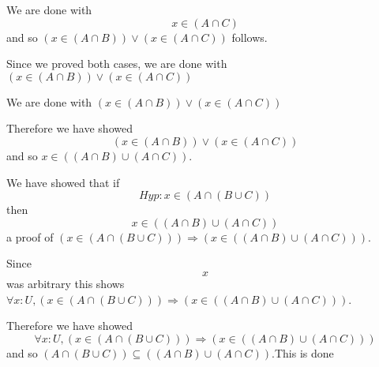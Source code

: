 \documentclass[11pt, oneside]{article}
\begin{document}
 We are done with $$x \in (A \cap C) $$ and so $(x \in (A \cap B)) \lor (x \in (A \cap C)) $ follows.

 Since we proved both cases, we are done with $(x \in (A \cap B)) \lor (x \in (A \cap C)) $

 We are done with $(x \in (A \cap B)) \lor (x \in (A \cap C)) $

 Therefore we have showed $$(x \in (A \cap B)) \lor (x \in (A \cap C)) $$ and so $x \in ((A \cap B) \cup (A \cap C)) $.

 We have showed that if $$Hyp : x \in (A \cap (B \cup C)) $$ then $$x \in ((A \cap B) \cup (A \cap C)) $$ a proof of $(x \in (A \cap (B \cup C))) \Rightarrow (x \in ((A \cap B) \cup (A \cap C))) $.

 Since $$x$$ was arbitrary this shows $\forall x : U, (x \in (A \cap (B \cup C))) \Rightarrow (x \in ((A \cap B) \cup (A \cap C))) $.

 Therefore we have showed $$\forall x : U, (x \in (A \cap (B \cup C))) \Rightarrow (x \in ((A \cap B) \cup (A \cap C))) $$ and so $(A \cap (B \cup C)) \subseteq ((A \cap B) \cup (A \cap C)) $.This is done
\end{document}
